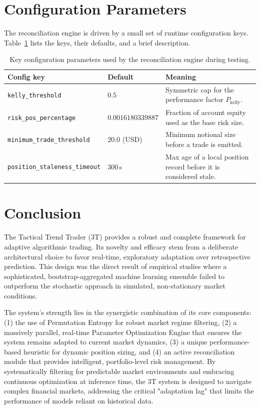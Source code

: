 \documentclass[10pt]{article}
\begin{document}
\section{Configuration Parameters}
The reconciliation engine is driven by a small set of runtime configuration keys. Table~\ref{tab:config} lists the keys, their defaults, and a brief description.

\begin{table}[t]
\small
\centering
\caption{Key configuration parameters used by the reconciliation engine during testing.}
\label{tab:config}
\begin{tabularx}{\textwidth}{@{} l l >{\raggedright\arraybackslash}X @{}}
\toprule
\textbf{Config key} & \textbf{Default} & \textbf{Meaning} \\
\midrule
\texttt{kelly\_threshold} & $0.5$ & Symmetric cap for the performance factor $P_{\text{kelly}}$. \\
\texttt{risk\_pos\_percentage} & $0.0016180339887$ & Fraction of account equity used as the base risk size. \\
\texttt{minimum\_trade\_threshold} & $20.0$ (USD) & Minimum notional size before a trade is emitted. \\
\texttt{position\_staleness\_timeout} & $300$\,s & Max age of a local position record before it is considered stale. \\
\bottomrule
\end{tabularx}
\end{table}

\section{Conclusion}
The Tactical Trend Trader (3T) provides a robust and complete framework for adaptive algorithmic trading. Its novelty and efficacy stem from a deliberate architectural choice to favor real-time, exploratory adaptation over retrospective prediction. This design was the direct result of empirical studies where a sophisticated, bootstrap-aggregated machine learning ensemble failed to outperform the stochastic approach in simulated, non-stationary market conditions.

The system's strength lies in the synergistic combination of its core components: (1) the use of Permutation Entropy for robust market regime filtering, (2) a massively parallel, real-time Parameter Optimization Engine that ensures the system remains adapted to current market dynamics, (3) a unique performance-based heuristic for dynamic position sizing, and (4) an active reconciliation module that provides intelligent, portfolio-level risk management. By systematically filtering for predictable market environments and embracing continuous optimization at inference time, the 3T system is designed to navigate complex financial markets, addressing the critical "adaptation lag" that limits the performance of models reliant on historical data.
\end{document}
